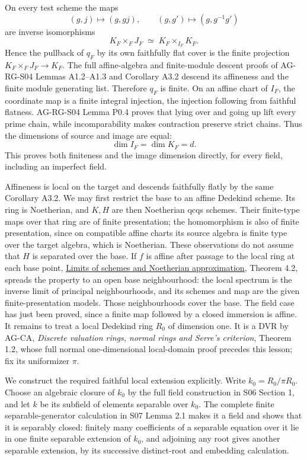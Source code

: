 \documentclass[11pt,a4paper,openany]{report}
\begin{document}
On every test scheme the maps \[
 (g,j)\longmapsto(g,gj),\qquad
 (g,g')\longmapsto(g,g^{-1}g')
\] are inverse isomorphisms \[
 K_F\times_FJ_F\;\simeq\;K_F\times_{I_F}K_F.
\] Hence the pullback of \(q_F\) by its own faithfully flat cover is the finite projection \(K_F\times_FJ_F\to K_F\). The full affine-algebra and finite-module descent proofs of AG-RG-S04 Lemmas A1.2--A1.3 and Corollary A3.2 descend its affineness and the finite module generating list. Therefore \(q_F\) is finite. On an affine chart of \(I_F\), the coordinate map is a finite integral injection, the injection following from faithful flatness. AG-RG-S04 Lemma P0.4 proves that lying over and going up lift every prime chain, while incomparability makes contraction preserve strict chains. Thus the dimensions of source and image are equal: \[
 \dim I_F=\dim K_F=d.
\] This proves both finiteness and the image dimension directly, for every field, including an imperfect field.

Affineness is local on the target and descends faithfully flatly by the same Corollary A3.2. We may first restrict the base to an affine Dedekind scheme. Its ring is Noetherian, and \(K,H\) are then Noetherian qcqs schemes. Their finite-type maps over that ring are of finite presentation; the homomorphism is also of finite presentation, since on compatible affine charts its source algebra is finite type over the target algebra, which is Noetherian. These observations do not assume that \(H\) is separated over the base. If \(f\) is affine after passage to the local ring at each base point, \href{https://github.com/KokunoYumeto/open-math-courses/blob/main/docs/courses/AG-MO/AG-MO-03.html}{Limits of schemes and Noetherian approximation}, Theorem 4.2, spreads the property to an open base neighbourhood: the local spectrum is the inverse limit of principal neighbourhoods, and its schemes and map are the given finite-presentation models. Those neighbourhoods cover the base. The field case has just been proved, since a finite map followed by a closed immersion is affine. It remains to treat a local Dedekind ring \(R_0\) of dimension one. It is a DVR by AG-CA, \emph{Discrete valuation rings, normal rings and Serre's criterion}, Theorem 1.2, whose full normal one-dimensional local-domain proof precedes this lesson; fix its uniformizer \(\pi\).

We construct the required faithful local extension explicitly. Write \(k_0=R_0/\pi R_0\). Choose an algebraic closure of \(k_0\) by the full field construction in S06 Section 1, and let \(k\) be its subfield of elements separable over \(k_0\). The complete finite separable-generator calculation in S07 Lemma 2.1 makes it a field and shows that it is separably closed: finitely many coefficients of a separable equation over it lie in one finite separable extension of \(k_0\), and adjoining any root gives another separable extension, by its successive distinct-root and embedding calculation.
\end{document}
